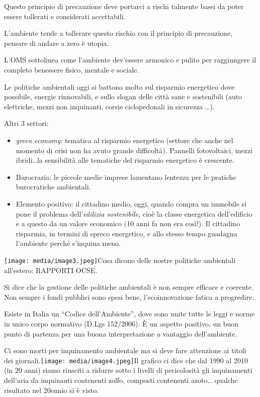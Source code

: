 \documentclass[]{article}
\begin{document}
Questo principio di precauzione deve portarci a rischi talmente bassi da
poter essere tollerati e considerati accettabili.

L'ambiente tende a tollerare questo rischio con il principio di
precauzione, pensare di andare a zero è utopia.

L'OMS sottolinea come l'ambiente dev'essere armonico e pulito per
raggiungere il completo benessere fisico, mentale e sociale.

Le politiche ambientali oggi si battono molto sul risparmio energetico
dove possibile, energie rinnovabili, e sullo slogan delle città sane e
sostenibili (auto elettriche, mezzi non inquinanti, corsie ciclopedonali
in sicurezza \ldots{}).

Altri 3 settori:

\begin{itemize}
\item
  \emph{green economy}: tematica al risparmio energetico (settore che
  anche nel momento di crisi non ha avuto grande difficoltà). Pannelli
  fotovoltaici, mezzi ibridi\ldots{}la sensibilità alle tematiche del
  risparmio energetico è crescente.
\item
  Burocrazia: le piccole medie imprese lamentano lentezza per le
  pratiche burocratiche ambientali.
\item
  Elemento positivo: il cittadino medio, oggi, quando compra un immobile
  si pone il problema dell'\emph{edilizia sostenibile}, cioè la classe
  energetica dell'edificio e a questo da un valore economico (10 anni fa
  non era così!). Il cittadino risparmia, in termini di spreco
  energetico, e allo stesso tempo guadagna l'ambiente perché s'inquina
  meno.
\end{itemize}

\texttt{[image: media/image3.jpeg]}Cosa
dicono delle nostre politiche ambientali all'estero: RAPPORTI OCSE.

Si dice che la gestione delle politiche ambientali è non sempre efficace
e coerente. Non sempre i fondi pubblici sono spesi bene,
l'ecoinnovazione fatica a progredire.

Esiste in Italia un ``Codice dell'Ambiente'', dove sono unite tutte le
leggi e norme in unico corpo normativo (D.Lgs 152/2006). È un aspetto
positivo, un buon punto di partenza per una buona interpretazione a
vantaggio dell'ambiente.

Ci sono morti per inquinamento ambientale ma si deve fare attenzione ai
titoli dei
giornali.\texttt{[image: media/image4.jpeg]}Il
grafico ci dice che dal 1990 al 2010 (in 20 anni) siamo riusciti a
ridurre sotto i livelli di pericolosità gli inquinamenti dell'aria da
inquinanti contenenti zolfo, composti contenenti azoto\ldots{} qualche
risultato nel 20ennio si è visto.
\end{document}
